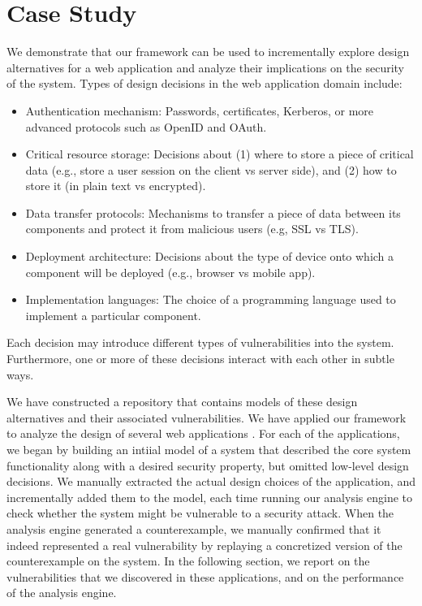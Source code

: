 
\section{Case Study}
\label{sec-case-study}

We demonstrate that our framework can be used to incrementally explore
design alternatives for a web application and analyze their
implications on the security of the system. Types of design decisions
in the web application domain include:
\begin{itemize}
\item Authentication mechanism: Passwords, certificates,
  Kerberos, or more advanced protocols such as OpenID and OAuth.
\item Critical resource storage: Decisions about (1) where to store a
  piece of critical data (e.g., store a user session on the client vs
  server side), and (2) how to store it (in plain text vs encrypted).
\item Data transfer protocols: Mechanisms to transfer a piece of data
  between its components and protect it from malicious users (e.g,
  SSL vs TLS).
\item Deployment architecture: Decisions about the type of device onto
  which a component will be deployed (e.g., browser vs mobile app).
\item Implementation languages: The choice of a programming language
  used to implement a particular component.
\end{itemize}
Each decision may introduce different types of vulnerabilities into
the system. Furthermore, one or more of these decisions interact with
each other in subtle ways.

We have constructed a repository that contains models of these design
alternatives and their associated vulnerabilities. We have applied our
framework to analyze the design of several web applications . For each of the applications, we began by building an
intiial model of a system that described the core system functionality
along with a desired security property, but omitted low-level design
decisions. We manually extracted the actual design choices of the
application, and incrementally added them to the model, each time
running our analysis engine to check whether the system might be
vulnerable to a security attack. When the analysis engine generated a
counterexample, we manually confirmed that it indeed represented a
real vulnerability by replaying a concretized version of the
counterexample on the system. In the following section, we report on
the vulnerabilities that we discovered in these applications, and on
the performance of the analysis engine.

